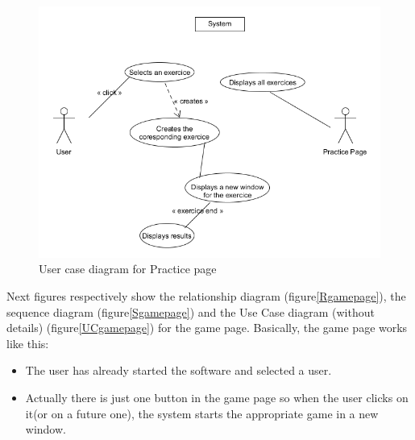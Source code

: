 \begin{figure}[H]
	\centering
    \includegraphics[width=12cm]{diagrams/UCpracticepage.png}
    \caption{User case diagram for Practice page}
    \label{UCpracticepage}
\end{figure}

Next figures respectively show the relationship diagram (figure\ref{Rgamepage}), the sequence diagram (figure\ref{Sgamepage}) and the Use Case diagram (without details) (figure\ref{UCgamepage}) for the game page. Basically, the game page works like this:
\begin{itemize}
\item The user has already started the software and selected a user.
\item Actually there is just one button in the game page so when the user clicks on it(or on a future one), the system starts the appropriate game in a new window.
\end{itemize}

